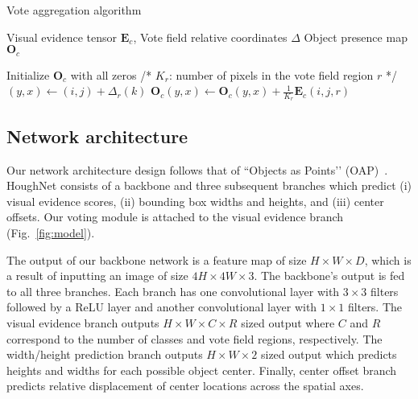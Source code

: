 \documentclass[runningheads]{llncs}
\begin{document}
\setlength\intextsep{8mm}
\begin{algorithm}
\caption{Vote aggregation algorithm}
\label{algo:voting}
\begin{algorithmic}
\REQUIRE Visual evidence tensor $\mathbf{E}_c$, Vote field relative coordinates $\Delta$
\ENSURE Object presence map $\mathbf{O}_c$ 


\STATE Initialize $\mathbf{O}_c$ with all zeros
\STATE /*  $K_r$: number of pixels in the vote field region $r$ */
\STATE $(y,x) \leftarrow (i,j) + \Delta_r(k)$ 
\STATE $\mathbf{O}_c(y,x) \leftarrow \mathbf{O}_c(y,x) + \frac{1}{K_r} \mathbf{E}_c(i,j,r)$
\ENDFOR
\ENDFOR
\end{algorithmic}
\end{algorithm}







\subsection{Network architecture}
Our network architecture design follows that of ``Objects as Points’’ (OAP)~\cite{centernet}. HoughNet consists of a backbone and three subsequent branches which predict  (i) visual evidence scores, (ii) bounding box widths and heights, and (iii) center offsets. Our voting module is attached to the visual evidence branch (Fig.~\ref{fig:model}). 


The output of our backbone network is a feature map of size $H\times W\times D$, which is a result of inputting an image of size $4H\times 4W\times 3$. The backbone’s output is fed to all three branches. 
Each branch has one convolutional layer with $3\times 3$  filters followed by a ReLU layer  and another convolutional layer with $1\times 1$ filters. The visual evidence branch outputs $H\times W\times C\times R$ sized output where $C$ and $R$ correspond to the number of classes and vote field regions, respectively.
The width/height prediction branch outputs $H\times W\times 2$ sized output which predicts heights and widths for each possible object center.
Finally, center offset branch predicts relative displacement of center locations across the spatial axes. 
 
\end{document}
